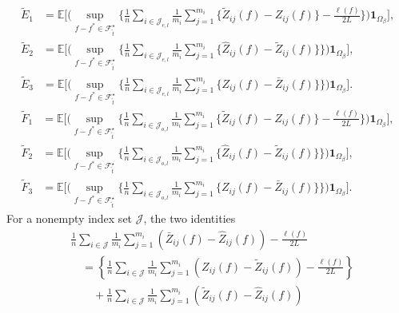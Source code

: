 \documentclass[twoside,11pt]{article}
\newenvironment{revision}{\color{revisionred}}{}
\begin{document}
\begin{revision}
\begin{theorem}
\begin{equation}
\begin{aligned}
\tilde E_1&=\mathbb E\Biggl[\Biggl(
\sup_{f-f^*\in\mathcal F_{\tilde t}^{\star}}
\biggl\{\frac1n\sum_{i\in\mathcal J_{e,l}}\frac1{m_i}
\sum_{j=1}^{m_i}\bigl\{\tilde Z_{ij}(f)-Z_{ij}(f)\bigr\}
-\frac{\ell(f)}{2L}
\biggr\}\Biggr)\mathbf1_{\Omega_\beta}\Biggr],\\
\tilde E_2&=\mathbb E\Biggl[\Biggl(
\sup_{f-f^*\in\mathcal F_{\tilde t}^{\star}}
\biggl\{\frac1n\sum_{i\in\mathcal J_{e,l}}\frac1{m_i}
\sum_{j=1}^{m_i}\bigl\{\hat Z_{ij}(f)-\tilde Z_{ij}(f)\bigr\}
\biggr\}\Biggr)\mathbf1_{\Omega_\beta}\Biggr],\\
\tilde E_3&=\mathbb E\Biggl[\Biggl(
\sup_{f-f^*\in\mathcal F_{\tilde t}^{\star}}
\biggl\{\frac1n\sum_{i\in\mathcal J_{e,l}}\frac1{m_i}
\sum_{j=1}^{m_i}\bigl\{Z_{ij}(f)-\bar Z_{ij}(f)\bigr\}
\biggr\}\Biggr)\mathbf1_{\Omega_\beta}\Biggr].
\end{aligned}
\end{equation}
\begin{equation}
\label{tilde_F}
\begin{aligned}
\tilde F_1&=\mathbb E\Biggl[\Biggl(
\sup_{f-f^*\in\mathcal F_{\tilde t}^{\star}}
\biggl\{\frac1n\sum_{i\in\mathcal J_{o,l}}\frac1{m_i}
\sum_{j=1}^{m_i}\bigl\{\tilde Z_{ij}(f)-Z_{ij}(f)\bigr\}
-\frac{\ell(f)}{2L}
\biggr\}\Biggr)\mathbf1_{\Omega_\beta}\Biggr],\\
\tilde F_2&=\mathbb E\Biggl[\Biggl(
\sup_{f-f^*\in\mathcal F_{\tilde t}^{\star}}
\biggl\{\frac1n\sum_{i\in\mathcal J_{o,l}}\frac1{m_i}
\sum_{j=1}^{m_i}\bigl\{\hat Z_{ij}(f)-\tilde Z_{ij}(f)\bigr\}
\biggr\}\Biggr)\mathbf1_{\Omega_\beta}\Biggr],\\
\tilde F_3&=\mathbb E\Biggl[\Biggl(
\sup_{f-f^*\in\mathcal F_{\tilde t}^{\star}}
\biggl\{\frac1n\sum_{i\in\mathcal J_{o,l}}\frac1{m_i}
\sum_{j=1}^{m_i}\bigl\{Z_{ij}(f)-\bar Z_{ij}(f)\bigr\}
\biggr\}\Biggr)\mathbf1_{\Omega_\beta}\Biggr].
\end{aligned}
\end{equation}
For a nonempty index set $\mathcal J$, the two identities
\begin{equation}
\label{eq_nonconvex_forward_decomposition}
\begin{aligned}
&\frac1n\sum_{i\in\mathcal J}\frac1{m_i}\sum_{j=1}^{m_i}
 (\bar Z_{ij}(f)-\hat Z_{ij}(f))-\frac{\ell(f)}{2L}\\
&\quad=\left\{\frac1n\sum_{i\in\mathcal J}\frac1{m_i}\sum_{j=1}^{m_i}
 (Z_{ij}(f)-\tilde Z_{ij}(f))-\frac{\ell(f)}{2L}\right\}\\
&\qquad+\frac1n\sum_{i\in\mathcal J}\frac1{m_i}\sum_{j=1}^{m_i}
 (\tilde Z_{ij}(f)-\hat Z_{ij}(f))\\

\end{aligned}
\end{equation}
\end{theorem}
\end{revision}
\end{document}
